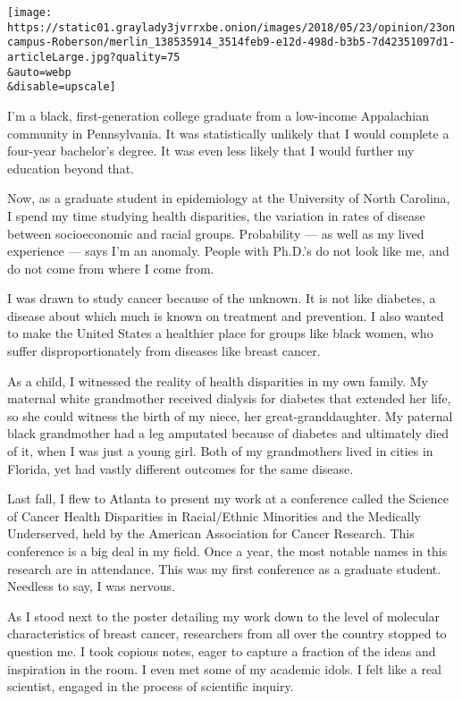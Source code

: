 \texttt{[image: https://static01.graylady3jvrrxbe.onion/images/2018/05/23/opinion/23oncampus-Roberson/merlin\_138535914\_3514feb9-e12d-498d-b3b5-7d42351097d1-articleLarge.jpg?quality=75\\\&auto=webp\\\&disable=upscale]}

I'm a black, first-generation college graduate from a low-income
Appalachian community in Pennsylvania. It was statistically unlikely
that I would complete a four-year bachelor's degree. It was even less
likely that I would further my education beyond that.

Now, as a graduate student in epidemiology at the University of North
Carolina, I spend my time studying health disparities, the variation in
rates of disease between socioeconomic and racial groups. Probability
--- as well as my lived experience --- says I'm an anomaly. People with
Ph.D.'s do not look like me, and do not come from where I come from.

I was drawn to study cancer because of the unknown. It is not like
diabetes, a disease about which much is known on treatment and
prevention. I also wanted to make the United States a healthier place
for groups like black women, who suffer disproportionately from diseases
like breast cancer.

As a child, I witnessed the reality of health disparities in my own
family. My maternal white grandmother received dialysis for diabetes
that extended her life, so she could witness the birth of my niece, her
great-granddaughter. My paternal black grandmother had a leg amputated
because of diabetes and ultimately died of it, when I was just a young
girl. Both of my grandmothers lived in cities in Florida, yet had vastly
different outcomes for the same disease.

Last fall, I flew to Atlanta to present my work at a conference called
the Science of Cancer Health Disparities in Racial/Ethnic Minorities and
the Medically Underserved, held by the American Association for Cancer
Research. This conference is a big deal in my field. Once a year, the
most notable names in this research are in attendance. This was my first
conference as a graduate student. Needless to say, I was nervous.

As I stood next to the poster detailing my work down to the level of
molecular characteristics of breast cancer, researchers from all over
the country stopped to question me. I took copious notes, eager to
capture a fraction of the ideas and inspiration in the room. I even met
some of my academic idols. I felt like a real scientist, engaged in the
process of scientific inquiry.

